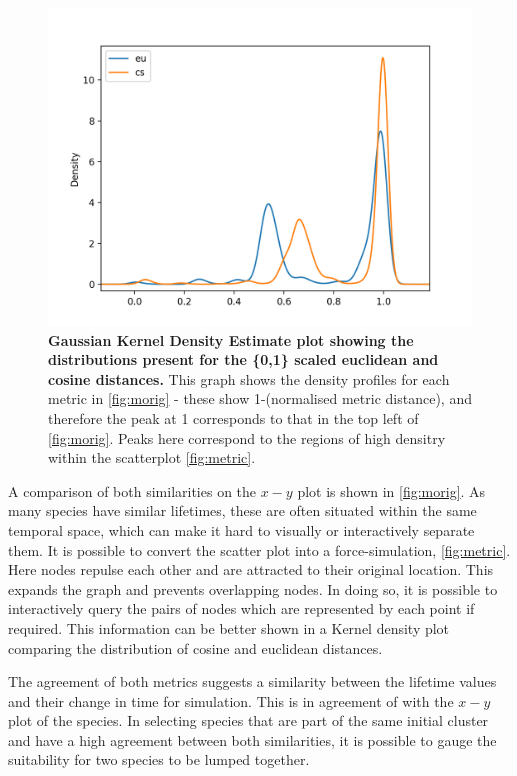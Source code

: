   \begin{figure}[H]
      \centering
  \includegraphics[width=.7\textwidth]{fig/metric_density.png}
  \caption{\textbf{Gaussian Kernel Density Estimate plot showing the distributions present for the \{0,1\} scaled euclidean and cosine distances.} This graph shows the density profiles for each metric in \autoref{fig:morig} - these show 1-(normalised metric distance), and therefore the peak at 1 corresponds to that in the top left of \autoref{fig:morig}. Peaks here correspond to the regions of high densitry within the scatterplot \autoref{fig:metric}.}
  \label{fig:density2}
  \end{figure}



  A comparison of both similarities on the $x-y$ plot is shown in \autoref{fig:morig}. As many species have similar lifetimes, these are often situated within the same temporal space, which can make it hard to visually or interactively separate them. It is possible to convert the scatter plot into a force-simulation, \autoref{fig:metric}. Here nodes repulse each other and are attracted to their original location. This expands the graph and prevents overlapping nodes. In doing so, it is possible to interactively query the pairs of nodes which are represented by each point if required. This information can be better shown in a Kernel density plot comparing the distribution of cosine and euclidean distances.

   The agreement of both metrics suggests a similarity between the lifetime values and their change in time for simulation. This is in agreement of with the $x-y$ plot of the species. In selecting species that are part of the same initial cluster and have a high agreement between both similarities, it is possible to gauge the suitability for two species to be lumped together.


